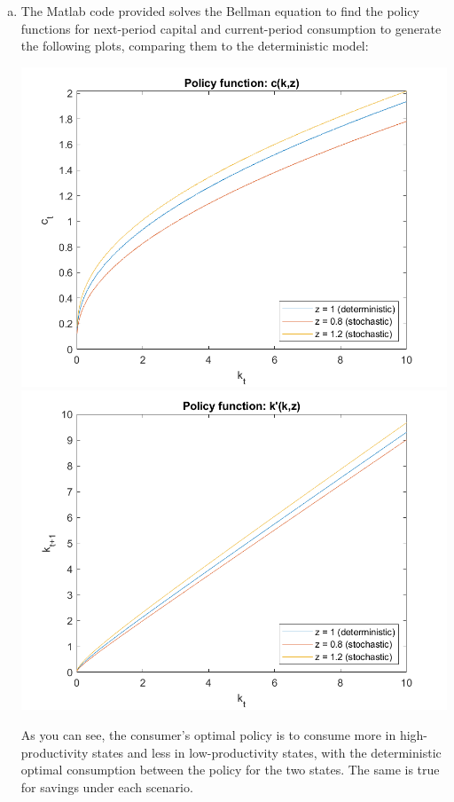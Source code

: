 \documentclass{article}
\begin{document}
\begin{enumerate}[(a)]
	\item The Matlab code provided solves the Bellman equation to find the policy functions for next-period capital and current-period consumption to generate the following plots, comparing them to the deterministic model:
		\begin{center}
			\includegraphics[scale=.35]{figure2ai.png} \includegraphics[scale=.35]{figure2aii.png}
		\end{center}
		As you can see, the consumer's optimal policy is to consume more in high-productivity states and less in low-productivity states, with the deterministic optimal consumption between the policy for the two states. The same is true for savings under each scenario.
	

\end{enumerate}
\end{document}
